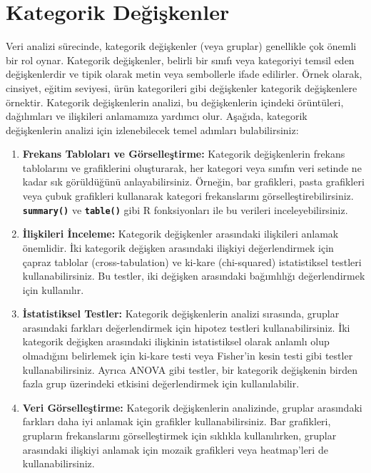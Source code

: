 \documentclass[
  letterpaper,
  DIV=11,
  numbers=noendperiod]{scrreprt}
\begin{document}
\hypertarget{kategorik-deux11fiux15fkenler}{%
\section*{Kategorik Değişkenler}\label{kategorik-deux11fiux15fkenler}}


Veri analizi sürecinde, kategorik değişkenler (veya gruplar) genellikle
çok önemli bir rol oynar. Kategorik değişkenler, belirli bir sınıfı veya
kategoriyi temsil eden değişkenlerdir ve tipik olarak metin veya
sembollerle ifade edilirler. Örnek olarak, cinsiyet, eğitim seviyesi,
ürün kategorileri gibi değişkenler kategorik değişkenlere örnektir.
Kategorik değişkenlerin analizi, bu değişkenlerin içindeki örüntüleri,
dağılımları ve ilişkileri anlamamıza yardımcı olur. Aşağıda, kategorik
değişkenlerin analizi için izlenebilecek temel adımları bulabilirsiniz:

\begin{enumerate}
\def\labelenumi{\arabic{enumi}.}
\item
  \textbf{Frekans Tabloları ve Görselleştirme:} Kategorik değişkenlerin
  frekans tablolarını ve grafiklerini oluşturarak, her kategori veya
  sınıfın veri setinde ne kadar sık görüldüğünü anlayabilirsiniz.
  Örneğin, bar grafikleri, pasta grafikleri veya çubuk grafikleri
  kullanarak kategori frekanslarını görselleştirebilirsiniz.
  \textbf{\texttt{summary()}} ve \textbf{\texttt{table()}} gibi R
  fonksiyonları ile bu verileri inceleyebilirsiniz.
\item
  \textbf{İlişkileri İnceleme:} Kategorik değişkenler arasındaki
  ilişkileri anlamak önemlidir. İki kategorik değişken arasındaki
  ilişkiyi değerlendirmek için çapraz tablolar (cross-tabulation) ve
  ki-kare (chi-squared) istatistiksel testleri kullanabilirsiniz. Bu
  testler, iki değişken arasındaki bağımlılığı değerlendirmek için
  kullanılır.
\item
  \textbf{İstatistiksel Testler:} Kategorik değişkenlerin analizi
  sırasında, gruplar arasındaki farkları değerlendirmek için hipotez
  testleri kullanabilirsiniz. İki kategorik değişken arasındaki
  ilişkinin istatistiksel olarak anlamlı olup olmadığını belirlemek için
  ki-kare testi veya Fisher'in kesin testi gibi testler
  kullanabilirsiniz. Ayrıca ANOVA gibi testler, bir kategorik değişkenin
  birden fazla grup üzerindeki etkisini değerlendirmek için
  kullanılabilir.
\item
  \textbf{Veri Görselleştirme:} Kategorik değişkenlerin analizinde,
  gruplar arasındaki farkları daha iyi anlamak için grafikler
  kullanabilirsiniz. Bar grafikleri, grupların frekanslarını
  görselleştirmek için sıklıkla kullanılırken, gruplar arasındaki
  ilişkiyi anlamak için mozaik grafikleri veya heatmap'leri de
  kullanabilirsiniz.
\end{enumerate}
\end{document}
